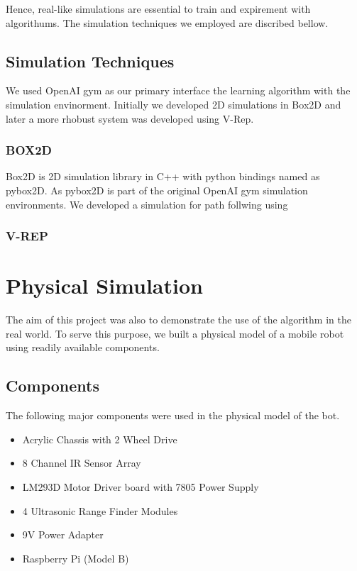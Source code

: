 \documentclass[12pt]{extreport}
\begin{document}
Hence, real-like simulations are essential to train and expirement with
algorithums. The simulation techniques we employed are discribed bellow.

\subsection{Simulation Techniques}

We used OpenAI gym as our primary interface the learning algorithm with the
simulation envinorment. Initially we developed 2D simulations in Box2D and
later a more rhobust system was developed using V-Rep.

\subsubsection{BOX2D}
Box2D is 2D simulation library in C++ with python bindings named as pybox2D.
As pybox2D is part of the original OpenAI gym simulation environments.
We developed a simulation for path follwing using


\subsubsection{V-REP}


\section{Physical Simulation}


The aim of this project was also to demonstrate the use of the algorithm in the real world. To serve this purpose, we built a physical model of a mobile robot using readily available components.

\subsection{Components}
The following major components were used in the physical model of the bot.
\begin{itemize}
 \item Acrylic Chassis with 2 Wheel Drive
 \item 8 Channel IR Sensor Array
 \item LM293D Motor Driver board with 7805 Power Supply
 \item 4 Ultrasonic Range Finder Modules
 \item 9V Power Adapter
 \item Raspberry Pi (Model B)
\end{itemize}
\end{document}
